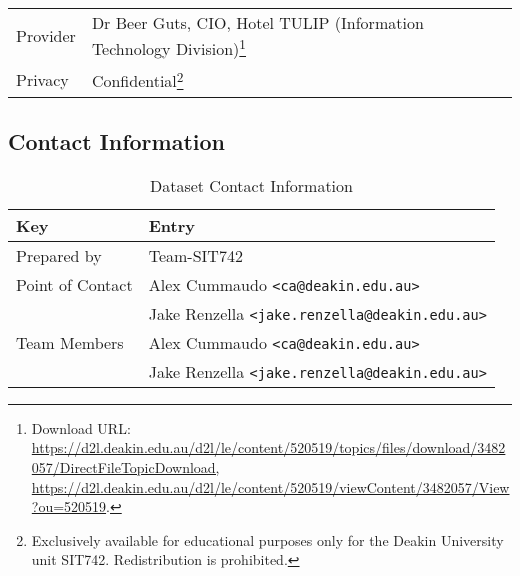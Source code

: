 \begin{table}[h!]
\begin{tabular}{@{}ll@{}}
Provider     & Dr Beer Guts, CIO, Hotel TULIP (Information Technology Division)\footnote{Download URL: \url{https://d2l.deakin.edu.au/d2l/le/content/520519/topics/files/download/3482057/DirectFileTopicDownload, https://d2l.deakin.edu.au/d2l/le/content/520519/viewContent/3482057/View?ou=520519}.} \\
Privacy      & Confidential\footnote{Exclusively available for educational purposes only for the Deakin University unit SIT742. Redistribution is prohibited.                                                                                                                                          } \\ 
\bottomrule
\end{tabular}
\end{table}

\subsection{Contact Information}
\label{app:data_dictionary:contact}

\begin{table}[h!]
\centering
\caption{Dataset Contact Information}
\label{tab:dataset_contact_info}
\vspace{12pt}
\begin{tabular}{@{}ll@{}}
\toprule
\textbf{Key}          & \textbf{Entry}                                                                                                                                                                                                                                                                             \\ \midrule
Prepared by      & Team-SIT742                                                               \\
Point of Contact & Alex Cummaudo \texttt{\textless ca@deakin.edu.au\textgreater}            \\
                 & Jake Renzella \texttt{\textless jake.renzella@deakin.edu.au\textgreater} \\
Team Members     & Alex Cummaudo \texttt{\textless ca@deakin.edu.au\textgreater}            \\
                 & Jake Renzella \texttt{\textless jake.renzella@deakin.edu.au\textgreater} \\
\bottomrule
\end{tabular}
\end{table}

